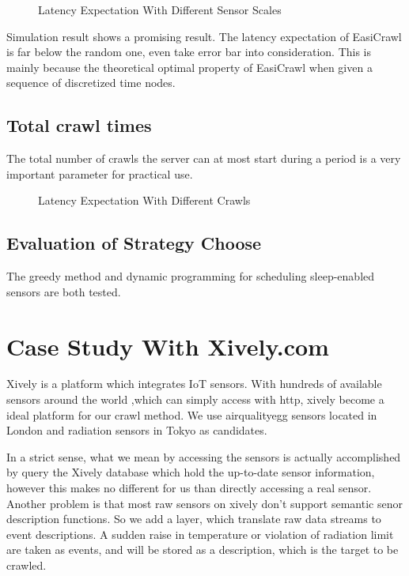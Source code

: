 \documentclass[conference]{IEEEtran}
\begin{document}
\begin{figure}
	\centering
	
	\captionsetup{justification=centering}
	\caption{Latency Expectation With Different Sensor Scales}
	\label{fig:test1_sensorscale}
\end{figure}

Simulation result shows a promising result. The latency expectation of EasiCrawl is far below the random one, even take error bar into consideration. This is mainly because the theoretical optimal property of EasiCrawl when given a sequence of discretized time nodes. 

\subsection{Total crawl times}

The total number of crawls the server can at most start during a period is a very important parameter for practical use. 

\begin{figure}
	\centering
	
	\captionsetup{justification=centering}
	\caption{Latency Expectation With Different Crawls}
	\label{fig:test2_totalcrawl}
\end{figure}



\subsection{Evaluation of Strategy Choose}

The greedy method and dynamic programming for scheduling sleep-enabled sensors are both tested.

\section{Case Study With Xively.com}

Xively is a platform which integrates IoT sensors. With hundreds of available sensors around the world ,which can simply access with http, xively become a ideal platform for our crawl method. 
We use airqualityegg\cite{airegg} sensors located in London and radiation sensors in Tokyo as candidates. 


In a strict sense, what we mean by accessing the sensors is actually accomplished by query the Xively database which hold the up-to-date sensor information, however this makes no different for us than directly accessing a real sensor. Another problem is that most raw sensors on xively don't support semantic senor description functions. So we add a layer, which translate raw data streams to event descriptions. A sudden raise in temperature or violation of radiation limit are taken as events, and will be stored as a description, which is the target to be crawled.
\end{document}
